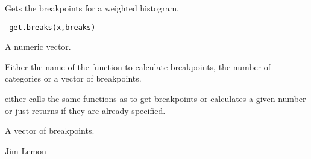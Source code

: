 \begin{Description}\relax
Gets the breakpoints for a weighted histogram.
\end{Description}
\begin{Usage}
\begin{verbatim}
 get.breaks(x,breaks)
\end{verbatim}
\end{Usage}
\begin{Arguments}
\begin{ldescription}
\item[\code{x}] A numeric vector.
\item[\code{breaks}] Either the name of the function to calculate breakpoints, the
number of categories or a vector of breakpoints.
\end{ldescription}
\end{Arguments}
\begin{Details}\relax
{} either calls the same functions as  to get
breakpoints or calculates a given number or just returns 
if they are already specified.
\end{Details}
\begin{Value}
A vector of breakpoints.
\end{Value}
\begin{Author}\relax
Jim Lemon
\end{Author}
\begin{SeeAlso}\relax
{}
\end{SeeAlso}

